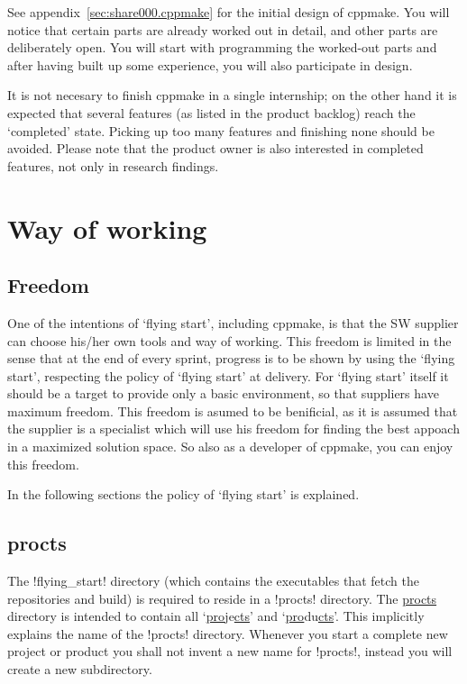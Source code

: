 See appendix~\ref{sec:share000.cppmake} for the initial design of cppmake. You
will notice that certain parts are already worked out in detail, and other parts
are deliberately open. You will start with programming the worked-out parts and
after having built up some experience, you will also participate in design.

It is not necesary to finish cppmake in a single internship; on the other hand
it is expected that several features (as listed in the product backlog) reach
the `completed' state. Picking up too many features and finishing none should
be avoided. Please note that the product owner is also interested in completed
features, not only in research findings.

\section{Way of working}
\label{sec:internship01.assignment.wayofworking}

\subsection{Freedom}

One of the intentions of `flying start', including cppmake, is that the SW
supplier can choose his/her own tools and way of working. This freedom is limited
in the sense that at the end of every sprint, progress is to be shown by
using the `flying start', respecting the policy of `flying start' at delivery.
For `flying start' itself it should be a target to provide only a basic 
environment, so that suppliers have maximum freedom. This freedom is asumed to be
benificial, as it is assumed that the supplier is a specialist which will use his
freedom for finding the best appoach in a maximized solution space. So also as a 
developer of cppmake, you can enjoy this freedom.

In the following sections the policy of `flying start' is explained.

\subsection{procts}

The !flying_start! directory (which contains the executables that fetch the 
repositories and build) is required to reside in a !procts! directory. The
\underline{procts} directory is intended to contain all 
`\underline{pro}je\underline{cts}' and `\underline{pro}du\underline{cts}'.
This implicitly explains the name of the !procts! directory. Whenever you 
start a complete new project or product you shall not invent a new name for 
!procts!, instead you will create a new subdirectory.

